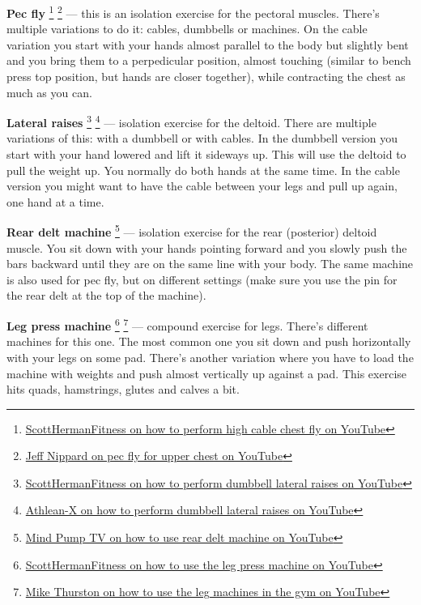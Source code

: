 \documentclass[openany, 12pt]{book}
\begin{document}
        \textbf{Pec fly}
        \footnote{\href{https://www.youtube.com/watch?v=Iwe6AmxVf7o}{ScottHermanFitness on how to perform high cable chest fly on YouTube}}
        \footnote{\href{https://www.youtube.com/watch?v=-EIhKMDSjBY}{Jeff Nippard on pec fly for upper chest on YouTube}}
        --- this is an isolation exercise for the pectoral muscles. There's multiple variations to do it: cables, dumbbells or machines.
        On the cable variation you start with your hands almost parallel to the body but slightly bent and you bring them to a perpedicular position, almost touching (similar to bench press top
        position, but hands are closer together), while contracting the chest as much as you can.

        \textbf{Lateral raises}
        \footnote{\href{https://www.youtube.com/watch?v=3VcKaXpzqRo}{ScottHermanFitness on how to perform dumbbell lateral raises on YouTube}}
        \footnote{\href{https://www.youtube.com/watch?v=q5sNYB1Q6aM}{Athlean-X on how to perform dumbbell lateral raises on YouTube}}
        ---
        isolation exercise for the deltoid. There are multiple variations of this: with a dumbbell or with cables. In the dumbbell version you start with your hand lowered and lift it sideways up.
        This will use the deltoid to pull the weight up. You normally do both hands at the same time.
        In the cable version you might want to have the cable between your legs and pull up again, one hand at a time.

        \textbf{Rear delt machine}
        \footnote{\href{https://www.youtube.com/watch?v=6yMdhi2DVao}{Mind Pump TV on how to use rear delt machine on YouTube}}
        ---
        isolation exercise for the rear (posterior) deltoid muscle. You sit down with your hands pointing forward and you slowly push the bars backward until they are on the same line with your body.
        The same machine is also used for pec fly, but on different settings (make sure you use the pin for the rear delt at the top of the machine).

        \textbf{Leg press machine}
        \footnote{\href{https://www.youtube.com/watch?v=IZxyjW7MPJQ}{ScottHermanFitness on how to use the leg press machine on YouTube}}
        \footnote{\href{https://www.youtube.com/watch?v=Uerf4Mj60Ug}{Mike Thurston on how to use the leg machines in the gym on YouTube}}
        ---
        compound exercise for legs. There's different machines for this one. The most common one you sit down and push horizontally with your legs on some pad. There's another variation where you
        have to load the machine with weights and push almost vertically up against a pad. This exercise hits quads, hamstrings, glutes and calves a bit.
\end{document}
